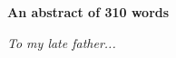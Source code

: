 \vspace{1.5\baselineskip}

\noindent\makebox[\linewidth]{\rule{0.7\textwidth}{0.4pt}}

\begin{center}
\textbf{An abstract of 310 words}
\end{center}

\newpage

\begin{flushright}
  \null{}
  \textit{To my late father...}
  \null
\end{flushright}
